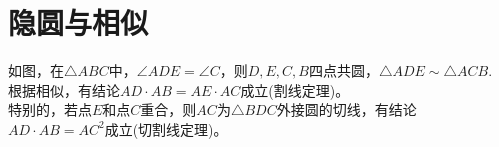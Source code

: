 \section{隐圆与相似}
\begin{definition}
    如图，在$\triangle ABC$中，$\angle ADE=\angle C$，则$D,E,C,B$四点共圆，$\triangle ADE \sim \triangle ACB.$ \\
    根据相似，有结论$AD·AB=AE·AC$成立(割线定理)。 \\
    特别的，若点$E$和点$C$重合，则$AC$为$\triangle BDC$外接圆的切线，有结论$AD·AB=AC^2$成立(切割线定理)。 \\
\end{definition}
